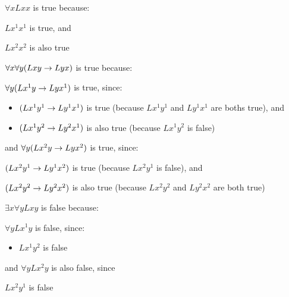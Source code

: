 \begin{ebullet}
\item $\forall xLxx$ is true because:
\begin{etriangle}
\item $Lx^1x^1$ is true, and
\item $Lx^2x^2$ is also true
\end{etriangle}
\end{ebullet}

\begin{ebullet}
\item $\forall x\forall y(Lxy \rightarrow Lyx)$ is true because:
\begin{etriangle}
\item $\forall y(Lx^1y \rightarrow Lyx^1)$ is true, since:
\begin{itemize}
\item $(Lx^1y^1 \rightarrow Ly^1x^1)$ is true (because $Lx^1y^1$ and $Ly^1x^1$ are boths true), and
\item $(Lx^1y^2 \rightarrow Ly^2x^1)$ is also true (because $Lx^1y^2$ is false)
\end{itemize}

\item and $\forall y(Lx^2y \rightarrow Lyx^2)$ is true, since:
\begin{etriangle}
\item $(Lx^2y^1 \rightarrow Ly^1x^2)$ is true (because $Lx^2y^1$ is false), and
\item $(Lx^2y^2 \rightarrow Ly^2x^2)$ is also true (because $Lx^2y^2$ and $Ly^2x^2$ are both true)
\end{etriangle}
\end{etriangle}
\end{ebullet}

\begin{ebullet}
\item $\exists x\forall yLxy$ is false because:
\begin{etriangle}
\item $\forall y Lx^1y$ is false, since:
\begin{itemize}
\item $Lx^1y^2$ is false
\end{itemize}
\item and $\forall y Lx^2y$ is also false, since
\begin{etriangle}
\item $Lx^2y^1$ is false
\end{etriangle}
\end{etriangle}
\end{ebullet}

